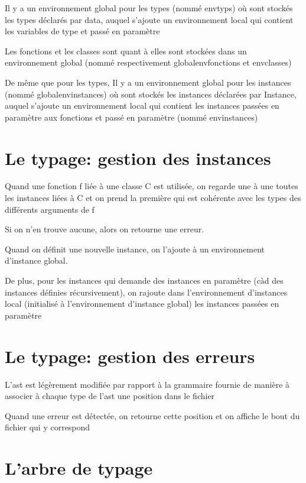 \documentclass[12pt,a4paper,french]{article}
\begin{document}
Il y a un environnement global pour les types (nommé envtyps) où sont stockés les types déclarés par data, auquel s'ajoute un environnement
local qui contient les variables de type et passé en paramètre

Les fonctions et les classes sont quant à elles sont stockées dans un environnement global (nommé respectivement globalenvfonctions et envclasses)

De même que pour les types, Il y a un environnement global pour les instances (nommé globalenvinstances) où sont stockés les instances déclarées par Instance, auquel s'ajoute un environnement
local qui contient les instances passées en paramètre aux fonctions et passé en paramètre (nommé envinstances)

\part*{Le typage: gestion des instances}

Quand une fonction f liée à une classe C est utilisée, on regarde une à une toutes les instances liées à C et on prend la
première qui est cohérente avec les types des différents arguments de f

Si on n'en trouve aucune, alors on retourne une erreur.

Quand on définit une nouvelle instance, on l'ajoute à un environnement d'instance global.

De plus, pour les instances qui demande des instances en paramètre (càd des instances définies récursivement),
on rajoute dans l'environnement d'instances local (initialisé à l'environnement d'instance global) les instances passées en paramètre



\part*{Le typage: gestion des erreurs}

L'ast est légèrement modifiée par rapport à la grammaire fournie de manière à associer à chaque type de l'ast une position dans le fichier

Quand une erreur est détectée, on retourne cette position et on affiche le bout du fichier qui y correspond


\part*{L'arbre de typage}
\end{document}
